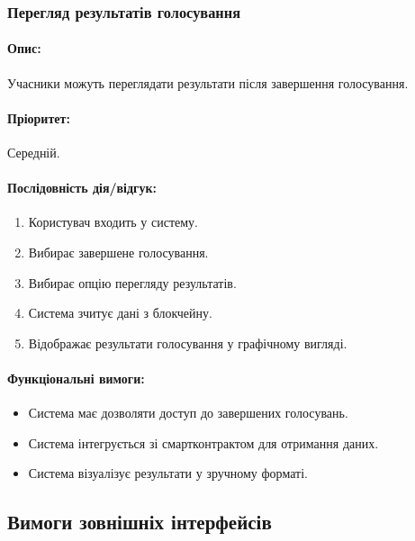 \documentclass[14pt]{extreport}
\newcounter{req}[subsubsection]
\newcommand\req{\arabic{req}\stepcounter{req}}
\begin{document}
  \subsubsection{Перегляд результатів голосування}  
  \paragraph{Опис:} Учасники можуть переглядати результати після завершення голосування.  
  \paragraph{Пріоритет:} Середній.  
  \paragraph{Послідовність дія/відгук:}  
  \begin{enumerate}  
      \item Користувач входить у систему.  
      \item Вибирає завершене голосування.  
      \item Вибирає опцію перегляду результатів.  
      \item Система зчитує дані з блокчейну.  
      \item Відображає результати голосування у графічному вигляді.  
  \end{enumerate}  
  \paragraph{Функціональні вимоги:}  
  \begin{itemize}[leftmargin=*,label=REQ-.\req:]  
      \item Система має дозволяти доступ до завершених голосувань.  
      \item Система інтегрується зі смартконтрактом для отримання даних.  
      \item Система візуалізує результати у зручному форматі.
  \end{itemize}  

  \subsection{Вимоги зовнішніх інтерфейсів}
\end{document}

